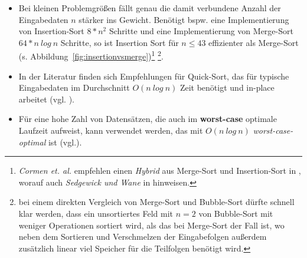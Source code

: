 \begin{itemize}
    \item Bei kleinen Problemgrößen fällt genau die damit verbundene Anzahl der Eingabedaten $n$ stärker ins Gewicht.
    Benötigt bspw. eine Implementierung von Insertion-Sort $8*n^2$ Schritte und eine Implementierung von Merge-Sort $64*n\ log\ n$ Schritte, so ist
    Insertion Sort für $n \leq 43$ effizienter als Merge-Sort (s. Abbildung~\ref{fig:insertionvsmerge})\footnote{
    \textit{Cormen et. al.} empfehlen einen \textit{Hybrid} aus Merge-Sort und Insertion-Sort in \cite[45, Problem 2-1]{CL22}, worauf auch \textit{Sedgewick und Wane} in \cite[275]{SW11} hinweisen.
    } \footnote{
        bei einem direkten Vergleich von Merge-Sort und Bubble-Sort dürfte schnell klar werden, dass ein unsortiertes Feld mit $n=2$ von Bubble-Sort mit weniger Operationen sortiert wird, als das bei Merge-Sort der Fall ist, wo neben dem Sortieren und Verschmelzen der Eingabefolgen außerdem zusätzlich linear viel Speicher für die Teilfolgen benötigt wird.
    }.

    \item In der Literatur finden sich Empfehlungen für Quick-Sort, das für typische Eingabedaten im Durchschnitt $O(n\ log\ n)$ Zeit benötigt und in-place arbeitet (vgl. \cite[182 ff.]{CL22}).

    \item Für eine hohe Zahl von Datensätzen, die auch im \textbf{worst-case} optimale Laufzeit aufweist, kann  verwendet werden, das mit $O(n\ log\ n)$ \textit{worst-case-optimal} ist (vgl.\cite[116]{OW17b}).
\end{itemize}


